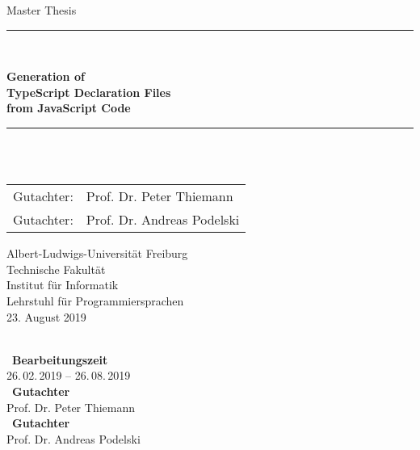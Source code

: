 \begin{titlepage}
\begin{center}

\newcommand{\HorizontalLine}{\rule{\linewidth}{0.3mm}}

{\Large Master Thesis}\\[1.3cm]


\HorizontalLine \\[0.4cm]
\begin{spacing}{3}
  {\huge \bfseries Generation of } \\
  {\huge \bfseries TypeScript Declaration Files} \\
  {\huge \bfseries from JavaScript Code}\\
\end{spacing}
\HorizontalLine \\[1.5cm]


{\Huge \theauthor} \\[2cm]


\begin{tabular}[hc]{>{\huge}l >{\huge}l}
  Gutachter: & Prof. Dr. Peter Thiemann \\[0.3cm]
  Gutachter: & Prof. Dr. Andreas Podelski \\[1.2cm]
\end{tabular}
\vfill  %

\Large {
    Albert-Ludwigs-Universität Freiburg\\
    Technische Fakultät\\
    Institut für Informatik\\
    Lehrstuhl für Programmiersprachen\\[1cm]

    23. August 2019
    \\
}
\end{center}
\end{titlepage}

\thispagestyle{empty}
\ \vfill \ \\  %
\
\textbf{Bearbeitungszeit}            \smallskip{} \\
26.\,02.\,2019 -- 26.\,08.\,2019   \bigskip{} \\
\
\textbf{Gutachter}                  \smallskip{} \\
Prof. Dr. Peter Thiemann               \bigskip{} \\
\
\textbf{Gutachter}                  \smallskip{} \\
Prof. Dr. Andreas Podelski
